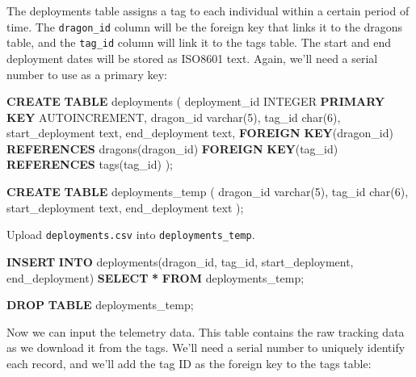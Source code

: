 \documentclass[
]{book}
\newenvironment{Shaded}{\begin{snugshade}}{\end{snugshade}}
\newcommand{\DataTypeTok}[1]{\textcolor[rgb]{0.13,0.29,0.53}{#1}}
\newcommand{\DecValTok}[1]{\textcolor[rgb]{0.00,0.00,0.81}{#1}}
\newcommand{\KeywordTok}[1]{\textcolor[rgb]{0.13,0.29,0.53}{\textbf{#1}}}
\newcommand{\NormalTok}[1]{#1}
\newcommand{\OperatorTok}[1]{\textcolor[rgb]{0.81,0.36,0.00}{\textbf{#1}}}
\begin{document}
The deployments table assigns a tag to each individual within a certain period
of time. The \texttt{dragon\_id} column will be the foreign key that links it to the
dragons table, and the \texttt{tag\_id} column will link it to the tags table. The start
and end deployment dates will be stored as ISO8601 text. Again, we'll need a
serial number to use as a primary key:

\begin{Shaded}
\begin{Highlighting}[]

\KeywordTok{CREATE} \KeywordTok{TABLE}\NormalTok{ deployments (}
\NormalTok{deployment\_id }\DataTypeTok{INTEGER} \KeywordTok{PRIMARY} \KeywordTok{KEY}\NormalTok{ AUTOINCREMENT,}
\NormalTok{dragon\_id }\DataTypeTok{varchar}\NormalTok{(}\DecValTok{5}\NormalTok{),}
\NormalTok{tag\_id }\DataTypeTok{char}\NormalTok{(}\DecValTok{6}\NormalTok{),}
\NormalTok{start\_deployment text,}
\NormalTok{end\_deployment text,}
\KeywordTok{FOREIGN} \KeywordTok{KEY}\NormalTok{(dragon\_id) }\KeywordTok{REFERENCES}\NormalTok{ dragons(dragon\_id)}
\KeywordTok{FOREIGN} \KeywordTok{KEY}\NormalTok{(tag\_id) }\KeywordTok{REFERENCES}\NormalTok{ tags(tag\_id)}
\NormalTok{);}

\KeywordTok{CREATE} \KeywordTok{TABLE}\NormalTok{ deployments\_temp (}
\NormalTok{dragon\_id }\DataTypeTok{varchar}\NormalTok{(}\DecValTok{5}\NormalTok{),}
\NormalTok{tag\_id }\DataTypeTok{char}\NormalTok{(}\DecValTok{6}\NormalTok{),}
\NormalTok{start\_deployment text,}
\NormalTok{end\_deployment text}
\NormalTok{);}
\end{Highlighting}
\end{Shaded}

Upload \texttt{deployments.csv} into \texttt{deployments\_temp}.

\begin{Shaded}
\begin{Highlighting}[]
\KeywordTok{INSERT} \KeywordTok{INTO}\NormalTok{ deployments(dragon\_id, tag\_id, start\_deployment, end\_deployment) }
\KeywordTok{SELECT} \OperatorTok{*} \KeywordTok{FROM}\NormalTok{ deployments\_temp;}

\KeywordTok{DROP} \KeywordTok{TABLE}\NormalTok{ deployments\_temp;}
\end{Highlighting}
\end{Shaded}

Now we can input the telemetry data. This table contains the raw tracking data
as we download it from the tags. We'll need a serial number to uniquely identify
each record, and we'll add the tag ID as the foreign key to the tags table:
\end{document}
